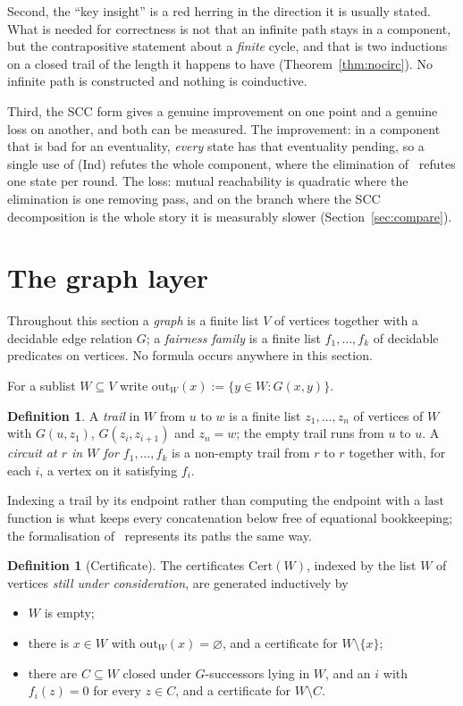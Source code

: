 \documentclass[11pt,a4paper]{article}
\theoremstyle{definition}
\newtheorem{definition}[theorem]{Definition}
\newcommand{\outs}{\mathrm{out}}
\begin{document}
Second, the ``key insight'' is a red herring in the direction it is usually
stated.  What is needed for correctness is not that an infinite path stays in a
component, but the contrapositive statement about a \emph{finite} cycle, and
that is two inductions on a closed trail of the length it happens to have
(Theorem~\ref{thm:nocirc}).  No infinite path is constructed and nothing is
coinductive.

Third, the SCC form gives a genuine improvement on one point and a genuine loss
on another, and both can be measured.  The improvement: in a component that is
bad for an eventuality, \emph{every} state has that eventuality pending, so a
single use of (Ind) refutes the whole component, where the elimination
of~\cite{m4} refutes one state per round.  The loss: mutual reachability is
quadratic where the elimination is one removing pass, and on the branch where
the SCC decomposition is the whole story it is measurably slower
(Section~\ref{sec:compare}).

\section{The graph layer}\label{sec:graph}

Throughout this section a \emph{graph} is a finite list $V$ of vertices
together with a decidable edge relation $G$; a \emph{fairness family} is a
finite list $f_1,\dots,f_k$ of decidable predicates on vertices.  No formula
occurs anywhere in this section.

For a sublist $W\subseteq V$ write $\outs_W(x):=\{y\in W: G(x,y)\}$.

\begin{definition}
A \emph{trail} in $W$ from $u$ to $w$ is a finite list $z_1,\dots,z_n$ of
vertices of $W$ with $G(u,z_1)$, $G(z_i,z_{i+1})$ and $z_n=w$; the empty trail
runs from $u$ to $u$.  A \emph{circuit at $r$ in $W$ for $f_1,\dots,f_k$} is a
non-empty trail from $r$ to $r$ together with, for each $i$, a vertex on it
satisfying $f_i$.
\end{definition}

Indexing a trail by its endpoint rather than computing the endpoint with a
$\mathrm{last}$ function is what keeps every concatenation below free of
equational bookkeeping; the formalisation of~\cite{m4} represents its paths
the same way.

\begin{definition}[Certificate]\label{def:cert}
The certificates $\mathrm{Cert}(W)$, indexed by the list $W$ of vertices
\emph{still under consideration}, are generated inductively by
\begin{itemize}
\item[(C0)] $W$ is empty;
\item[(C1)] there is $x\in W$ with $\outs_W(x)=\varnothing$, and a certificate
  for $W\setminus\{x\}$;
\item[(C2)] there are $C\subseteq W$ closed under $G$-successors lying in $W$,
  and an $i$ with $f_i(z)=0$ for every $z\in C$, and a certificate for
  $W\setminus C$.
\end{itemize}
\end{definition}
\end{document}
